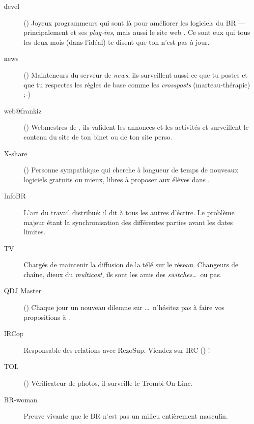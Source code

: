 \begin{description}
  \item[devel]{() Joyeux programmeurs qui sont l\`a pour am\'eliorer les logiciels du BR --- principalement  et ses \emph{plug-ins}, mais aussi le site web . Ce sont eux qui tous les deux mois (dans l'idéal) te disent que ton  n'est pas \`a jour.}

  \item[news] {() Mainteneurs du serveur de \emph{news}, ils surveillent aussi ce que tu postes et que tu respectes les r\`egles de base comme les \emph{crossposts} (marteau-th\'erapie) \mbox{;-)}}

  \item[web@frankiz] {() Webmestres de \fkz, ils valident les annonces et les activit\'es et surveillent le contenu du site de ton binet ou de ton site perso.}

  \item[X-share] {() Personne sympathique qui cherche \`a longueur de temps de nouveaux logiciels gratuits ou mieux, libres \`a proposer aux \'el\`eves dans \xshare.}

  \item[InfoBR]{L'art du travail distribu\'e: il dit \`a tous les autres d'\'ecrire. Le probl\`eme majeur \'etant la synchronisation des diff\'erentes parties avant les dates limites.}

  \item[TV]{Charg\'es de maintenir la diffusion de la t\'el\'e sur le r\'eseau. Changeurs de cha\^ine, dieux du \emph{multicast}, ils sont les amis des \emph{switches}\dots\ ou pas.}

  \item[QDJ Master] {() Chaque jour un nouveau dilemne sur \fkz\dots\ n'h\'esitez pas \`a faire vos propositions \`a .}

  \item[IRCop]{Responsable des relations avec RezoSup. Viendez sur IRC () !}

  \item[TOL] {() V\'erificateur de photos, il surveille le Trombi-On-Line.}

  \item[BR-woman]{Preuve vivante que le BR n'est pas un milieu enti\`erement masculin.}

\end{description}

